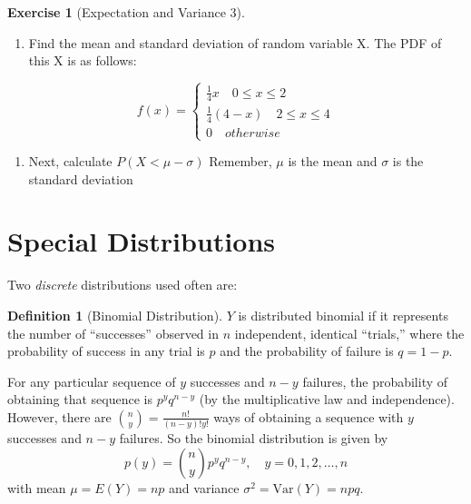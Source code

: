 \documentclass[
]{book}
\providecommand{\tightlist}{%
  \setlength{\itemsep}{0pt}\setlength{\parskip}{0pt}}
\theoremstyle{definition}
\newtheorem{definition}{Definition}[chapter]
\theoremstyle{definition}
\theoremstyle{definition}
\newtheorem{exercise}{Exercise}[chapter]
\theoremstyle{remark}
\begin{document}
\begin{exercise}[Expectation and Variance 3]
\protect\hypertarget{exr:expvar3}{}{\label{exr:expvar3} {} }

\begin{enumerate}
\def\labelenumi{\arabic{enumi}.}
\tightlist
\item
  Find the mean and standard deviation of random variable X. The PDF of this X is as follows:
\end{enumerate}

\[f(x) =  \begin{cases}
              \frac{1}{4}x \quad 0 \leq x \leq 2\\
               \frac{1}{4}(4 - x)  \quad 2 \leq x \leq 4\\
               0 \quad otherwise
            \end{cases}
               \]

\begin{enumerate}
\def\labelenumi{\arabic{enumi}.}
\setcounter{enumi}{1}
\tightlist
\item
  Next, calculate \(P(X < \mu - \sigma)\) Remember, \(\mu\) is the mean and \(\sigma\) is the standard deviation
\end{enumerate}
\end{exercise}

\hypertarget{special-distributions}{%
\section{Special Distributions}\label{special-distributions}}

Two \emph{discrete} distributions used often are:

\begin{definition}[Binomial Distribution]
\protect\hypertarget{def:unnamed-chunk-87}{}{\label{def:unnamed-chunk-87} {} }\(Y\) is distributed binomial if it represents the number of ``successes'' observed in \(n\) independent, identical ``trials,'' where the probability of success in any trial is \(p\) and the probability of failure is \(q=1-p\).
\end{definition}

For any particular sequence of \(y\) successes and \(n-y\) failures, the probability of obtaining that sequence is \(p^y q^{n-y}\) (by the multiplicative law and independence). However, there are \(\binom{n}{y}=\frac{n!}{(n-y)!y!}\) ways of obtaining a sequence with \(y\) successes and \(n-y\) failures. So the binomial distribution is given by \[p(y)=\binom{n}{y}p^y q^{n-y}, \quad y=0,1,2,\ldots,n\] with mean \(\mu=E(Y)=np\) and variance \(\sigma^2=\text{Var}(Y)=npq\).
\end{document}
